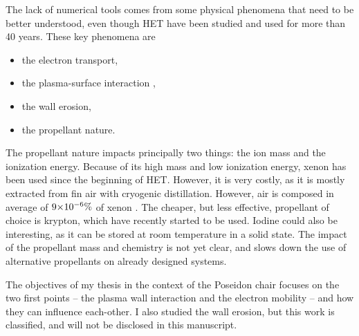 The lack of numerical tools comes from some physical phenomena that need to be better understood, even though \ac{HET} have been studied and used for more than 40 years.
These key phenomena are \citep{samukawa2012,adamovich2017}
\begin{itemize}
  \item the electron transport,
  \item the plasma-surface interaction ,
  \item the wall erosion,
  \item the propellant nature.
\end{itemize}

\vspace{1em}
The propellant nature impacts principally two things\string: the ion mass and the ionization energy.
Because of its high mass and low ionization energy, xenon has been used since the beginning of \ac{HET}. 
However, it is very costly, as it is mostly extracted from fin air with cryogenic distillation.
However, air is composed in average of ${{9}{\times}10^{-6}}\%$ of xenon \citep{earthfacs}.
The cheaper, but less effective, propellant of choice is krypton, which have recently started to be used.
Iodine could also be interesting, as it can be stored at room temperature in a solid state.
The impact of the propellant mass and chemistry is not yet clear, and slows down the use of alternative propellants on already designed systems.

\vspace{1em}
The objectives of my thesis in the context of the {\sc Poseidon} chair focuses on the two first points -- the plasma wall interaction and the electron mobility -- and how they can influence each-other.
I also studied the wall erosion, but this work is classified, and will not be disclosed in this manuscript.





